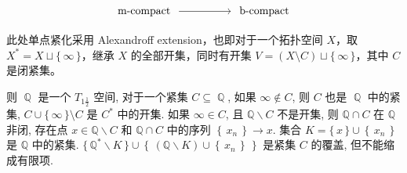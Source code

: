 \documentclass[options]{article}
\begin{document}
\[
		\begin{tikzcd}
			\text { m-compact }\ar[rr]&& \text { b-compact }
		\end{tikzcd}
\]
\begin{remark}
	此处单点紧化采用 Alexandroff extension，也即对于一个拓扑空间 $X$，取 $X^*=X\sqcup\{\,\infty\,\}$，继承 $X$ 的全部开集，同时有开集 $V=(X\setminus C)\sqcup\{\,\infty\,\}$，其中 $C$ 是闭紧集。

	则 $\BbbQ$ 是一个 $T_{1\frac{1}{2}}$ 空间, 对于一个紧集 $C\subseteq \BbbQ$, 如果 $\infty\not\in C$, 则 $C$ 也是 $\BbbQ$ 中的紧集, $C\cup\{\,\infty\,\}\setminus C$ 是 $C^*$ 中的开集. 如果 $\infty\in C$, 且 $\mathbb{Q} \backslash C$ 不是开集, 则 $\mathbb{Q} \cap C$ 在 $\mathbb{Q}$ 非闭, 存在点 $x \in \mathbb{Q} \backslash C$ 和 $\mathbb{Q} \cap C$ 中的序列 $\left\{\,x_n\,\right\}\to x$. 集合 $K=\{\,x\,\} \cup\left\{\,x_n\,\right\}$ 是 $\mathbb{Q}$ 中的紧集. $\{\,\mathbb{Q}^* \backslash K\,\} \cup\left\{\,(\mathbb{Q} \backslash K) \cup\left\{\,x_n\,\right\}\,\right\}$ 是紧集 $C$ 的覆盖, 但不能缩成有限项.
\end{remark}
\end{document}
